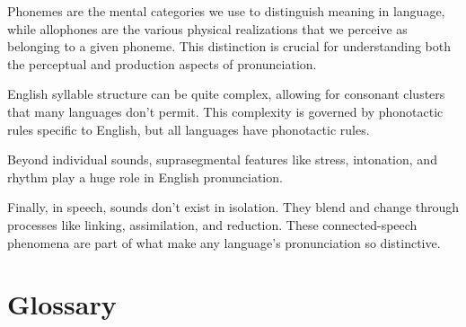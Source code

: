 Phonemes are the mental categories we use to distinguish meaning in language, while allophones are the various physical realizations that we perceive as belonging to a given phoneme. This distinction is crucial for understanding both the perceptual and production aspects of pronunciation.

English syllable structure can be quite complex, allowing for consonant clusters that many languages don't permit. This complexity is governed by phonotactic rules specific to English, but all languages have phonotactic rules.

Beyond individual sounds, suprasegmental features like stress, intonation, and rhythm play a huge role in English pronunciation.

Finally, in speech, sounds don't exist in isolation. They blend and change through processes like linking, assimilation, and reduction. These connected-speech phenomena are part of what make any language's pronunciation so distinctive.



\section{Glossary}

